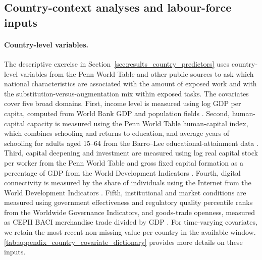 \documentclass[11pt]{article}
\begin{document}
\FloatBarrier
\subsection{Country-context analyses and labour-force inputs}
\label{sec:data_country}
\label{sec:methods_weighting}

\paragraph{Country-level variables.} The descriptive exercise in Section~\ref{sec:results_country_predictors} uses country-level variables from the Penn World Table and other public sources to ask which national characteristics are associated with the amount of exposed work and with the substitution-versus-augmentation mix within exposed tasks. The covariates cover five broad domains. First, income level is measured using log GDP per capita, computed from World Bank GDP and population fields \citep{worldbank_wdi}. Second, human-capital capacity is measured using the Penn World Table human-capital index, which combines schooling and returns to education, and average years of schooling for adults aged 15--64 from the Barro--Lee educational-attainment data \citep{FeenstraInklaarTimmer2015PWT,BarroLee2013Education}. Third, capital deepening and investment are measured using log real capital stock per worker from the Penn World Table and gross fixed capital formation as a percentage of GDP from the World Development Indicators \citep{FeenstraInklaarTimmer2015PWT,worldbank_wdi}. Fourth, digital connectivity is measured by the share of individuals using the Internet from the World Development Indicators \citep{worldbank_wdi}. Fifth, institutional and market conditions are measured using government effectiveness and regulatory quality percentile ranks from the Worldwide Governance Indicators, and goods-trade openness, measured as CEPII BACI merchandise trade divided by GDP \citep{worldbank_wgi,GaulierZignago2010BACI}. For time-varying covariates, we retain the most recent non-missing value per country in the available window. \ref{tab:appendix_country_covariate_dictionary} provides more details on these inputs.
\end{document}
